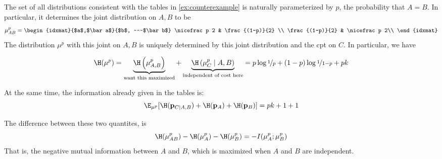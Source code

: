 \documentclass{article}
\def\nf{\nicefrac}
\begin{document}
	\begin{example}[continues=ex:counterexample]
		The set of all distributions consistent with the tables in \ref{ex:counterexample} is naturally parameterized by $p$, the probability that $A = B$. In particular, it determines the joint distribution on $A,B$ to be
		\[ \mu_{AB}^{p} = \begin{idxmat}{$a$,$\bar a$}{$b$,  ~~~$\bar b$}
				\nf p 2 & \frac{(1-p)}{2} \\
				\frac {(1-p)}{2} & \nf p 2\\
			\end{idxmat}
		\]
		The distribution $\mu^{p}$ with this joint on $A, B$ is uniquely determined by this joint distribution and the cpt on $C$. In particular, we have 
		
		\[ \H(\mu^{p}) = \underbrace{\H\left(\mu^{p}_{A,B}\right)}_{\text{want this maximized}} + \underbrace{\H\left(\mu^{p}_{C }\mid A,B\right)}_{\text{independent of cost here}}
		 	= p \log \nf1p + (1-p) \log \nf1{1-p} + pk\]
			
		At the same time, the information already given in the tables is:
		\[ \E_{\mu^{p}} [ \H(\mathbf p_{C\mid A,B}) + \H(\mathbf p_{A}) + \H(\mathbf p_{B}) ]
		 = pk + 1 + 1 \]
		 
		 The difference between these two quantites, is 
		 \[ \H(\mu_{AB}^{p}) - \H(\mu^{p}_A) - \H(\mu^{p}_B) = -I(\mu^p_A ; \mu^p_B) \]
		 That is, the negative mutual information between $A$ and $B$, which is maximized when $A$ and $B$ are independent.
	\end{example}
	
	

	
%	
%	
	
\end{document}
